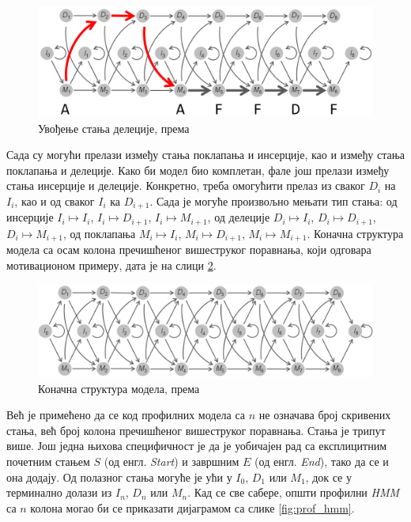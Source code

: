 \documentclass[12pt,oneside]{memoir}
\begin{document}
\begin{CJK}{UTF8}{ipxm}
\begin{figure}[H]
  \centering
  \includegraphics[width=\textwidth]{delecije2.png}
  \caption{Увођење стања делеције, према \cite{compeau2015}}
  \label{fig:delecije2}
\end{figure}

Сада су могући прелази између стања поклапања и инсерције, као и између стања поклапања и делеције. Како би модел био комплетан, фале још прелази између стања инсерције и делеције. Конкретно, треба омогућити прелаз из сваког $D_i$ на $I_i$, као и од сваког $I_i$ ка $D_{i+1}$. Сада је могуће произвољно мењати тип стања: од инсерције $I_i \mapsto I_i$, $I_i \mapsto D_{i+1}$, $I_i \mapsto M_{i+1}$, од делеције $D_i \mapsto I_i$, $D_i \mapsto D_{i+1}$, $D_i \mapsto M_{i+1}$, од поклапања $M_i \mapsto I_i$, $M_i \mapsto D_{i+1}$, $M_i \mapsto M_{i+1}$. Коначна структура модела са осам колона пречишћеног вишеструког поравнања, који одговара мотивационом примеру, дата је на слици \ref{fig:indeli}.

\begin{figure}[H]
  \centering
  \includegraphics[width=\textwidth]{indeli.png}
  \caption{Коначна структура модела, према \cite{compeau2015}}
  \label{fig:indeli}
\end{figure}

Већ је примећено да се код профилних модела са $n$ не означава број скривених стања, већ број колона пречишћеног вишеструког поравнања. Стања је трипут више. Још једна њихова специфичност је да је уобичајен рад са експлицитним почетним стањем $S$ (од енгл. \textit{Start}) и завршним $E$ (од енгл. \textit{End}), тако да се и она додају. Од полазног стања могуће је ући у $I_0$, $D_1$ или $M_1$, док се у терминално долази из $I_n$, $D_n$ или $M_n$. Кад се све сабере, општи профилни \textit{HMM} са $n$ колона могао би се приказати дијаграмом са слике \ref{fig:prof_hmm}.


\end{CJK}
\end{document}
